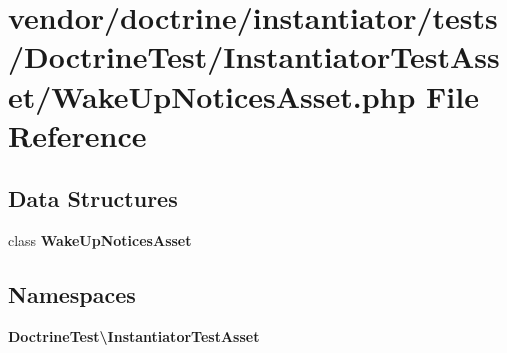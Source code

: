 \section{vendor/doctrine/instantiator/tests/\+Doctrine\+Test/\+Instantiator\+Test\+Asset/\+Wake\+Up\+Notices\+Asset.php File Reference}
\label{_wake_up_notices_asset_8php}
\subsection*{Data Structures}
\begin{DoxyCompactItemize}
\item 
class {\bf Wake\+Up\+Notices\+Asset}
\end{DoxyCompactItemize}
\subsection*{Namespaces}
\begin{DoxyCompactItemize}
\item 
 {\bf Doctrine\+Test\textbackslash{}\+Instantiator\+Test\+Asset}
\end{DoxyCompactItemize}
